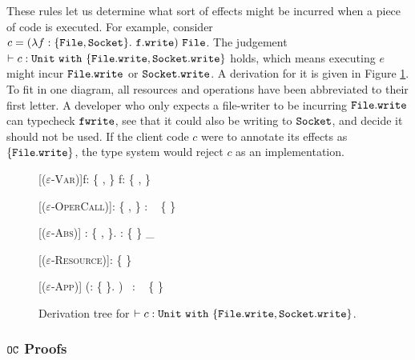 These rules let us determine what sort of effects might be incurred when a piece of code is executed. For example, consider $c = (\lambda f: \{ \mathtt{File, Socket} \}.~\mathtt{f.write})~\mathtt{File}$. The judgement $\vdash c: \mathtt{Unit}~\mathtt{with}~ \{ \mathtt{File.write, Socket.write} \}$ holds, which means executing $e$ might incur $\mathtt{File.write}$ or $\mathtt{Socket.write}$. A derivation for it is given in Figure \ref{fig:opercalc_tree}. To fit in one diagram, all resources and operations have been abbreviated to their first letter. A developer who only expects a file-writer to be incurring $\mathtt{File.write}$ can typecheck $\mathtt{fwrite}$, see that it could also be writing to $\mathtt{Socket}$, and decide it should not be used. If the client code $c$ were to annotate its effects as $\mathtt{ \{ \mathtt{File.write} \} }$, the type system would reject $c$ as an implementation.

\begin{figure}[h]


    \begin{prooftree*}

    		[\textsc{($\varepsilon$-Var)}]{f: \{ ,  \} \vdash f: \{ ,  \}}
    		
    		[\textsc{($\varepsilon$-OperCall)}]{: \{ ,  \} \vdash {} : \Unit~ \{  \} }
    		
    		[\textsc{($\varepsilon$-Abs)}]{ \lambda {}: \{ ,  \}.  : \{  \} \rightarrow_{} \Unit~ \varnothing }
    		
    
       [\textsc{($\varepsilon$-Resource)}]{\vdash {}: \{  \}~ \varnothing}
    
    		[\textsc{($\varepsilon$-App)}]{ \vdash (\lambda {}: \{  \}. )~ : \Unit~ \{  \}  }
    		
 	\end{prooftree*}
 	
\vspace{-12pt}
\caption{Derivation tree for $\vdash c: \mathtt{Unit}~\mathtt{with}~ \{ \mathtt{File.write, Socket.write} \}$.}
\label{fig:opercalc_tree}
\end{figure}

\subsubsection{$\mathtt{OC}$ Proofs}~\\


